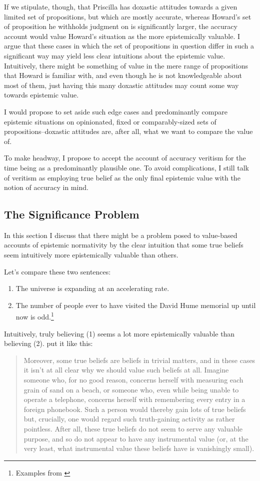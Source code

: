 \documentclass[12pt,numbers=noenddot]{scrartcl}
\begin{document}
If we stipulate, though, that Priscilla has doxastic attitudes towards a given limited set of propositions, but which are mostly accurate, whereas Howard's set of proposition he withholds judgment on is significantly larger, the accuracy account would value Howard's situation as the more epistemically valuable. I argue that these cases in which the set of propositions in question differ in such a significant way may yield less clear intuitions about the epistemic value. Intuitively, there might be something of value in the mere range of propositions that Howard is familiar with, and even though he is not knowledgeable about most of them, just having this many doxastic attitudes may count some way towards epistemic value.

I would propose to set aside such edge cases and predominantly compare epistemic situations on opinionated, fixed or comparably-sized sets of propositions–doxastic attitudes are, after all, what we want to compare the value of.

To make headway, I propose to accept the account of accuracy veritism for the time being as a predominantly plausible one. To avoid complications, I still talk of veritism as employing true belief as the only final epistemic value with the notion of accuracy in mind.

\subsection{The Significance Problem}

In this section I discuss that there might be a problem posed to value-based accounts of epistemic normativity by the clear intuition that some true beliefs seem intuitively more epistemically valuable than others.

Let's compare these two sentences:
\begin{enumerate}
    \item The universe is expanding at an accelerating rate.
    \item The number of people ever to have visited the David Hume memorial up until now is odd.\footnote{Examples from \textcite{Ahlstrom-Vij2013}}
\end{enumerate}

Intuitively, truly believing (1) seems a lot more epistemically valuable than believing (2). \textcite{sep-knowledge-value} put it like this:

\begin{quote}
    Moreover, some true beliefs are beliefs in trivial matters, and in these cases it isn't at all clear why we should value such beliefs at all. Imagine someone who, for no good reason, concerns herself with measuring each grain of sand on a beach, or someone who, even while being unable to operate a telephone, concerns herself with remembering every entry in a foreign phonebook. Such a person would thereby gain lots of true beliefs but, crucially, one would regard such truth-gaining activity as rather pointless. After all, these true beliefs do not seem to serve any valuable purpose, and so do not appear to have any instrumental value (or, at the very least, what instrumental value these beliefs have is vanishingly small).
\end{quote}
\end{document}
